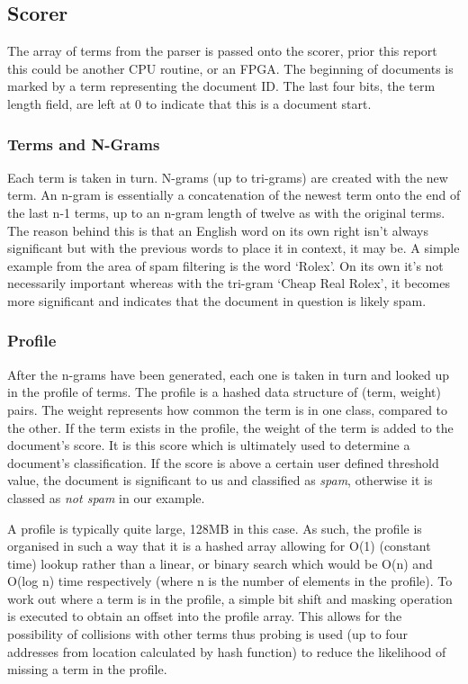 \subsection{Scorer}

The array of terms from the parser is passed onto the scorer, prior this report
this could be another CPU routine, or an FPGA. The beginning of documents is
marked by a term representing the document ID. The last four bits, the term
length field, are left at 0 to indicate that this is a document start.

\subsubsection{Terms and N-Grams}

Each term is taken in turn. N-grams (up to tri-grams) are created with the new
term. An n-gram is essentially a concatenation of the newest term onto the end
of the last n-1 terms, up to an n-gram length of twelve as with the original
terms. The reason behind this is that an English word on its own right isn't
always significant but with the previous words to place it in context, it may
be. A simple example from the area of spam filtering is the word `Rolex'. On its
own it's not necessarily important whereas with the tri-gram `Cheap Real Rolex',
it becomes more significant and indicates that the document in question is
likely spam.

\subsubsection{Profile}

After the n-grams have been generated, each one is taken in turn and looked up
in the profile of terms. The profile is a hashed data structure of (term,
weight) pairs. The weight represents how common the term is in one class,
compared to the other. If the term exists in the profile, the weight of the term
is added to the document's score. It is this score which is ultimately used to
determine a document's classification. If the score is above a certain user
defined threshold value, the document is significant to us and classified as
\emph{spam}, otherwise it is classed as \emph{not spam} in our example.

A profile is typically quite large, 128MB in this case. As such, the profile is
organised in such a way that it is a hashed array allowing for O(1) (constant
time) lookup rather than a linear, or binary search which would be O(n) and
O(log n) time respectively (where n is the number of elements in the profile).
To work out where a term is in the profile, a simple bit shift and masking
operation is executed to obtain an offset into the profile array. This allows
for the possibility of collisions with other terms thus probing is used (up to
four addresses from location calculated by hash function) to reduce the
likelihood of missing a term in the profile.

